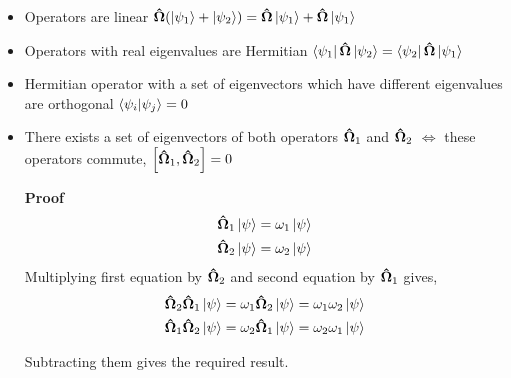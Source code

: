 \documentclass[11pt]{article}
\theoremstyle{definition}
\begin{document}
\begin{itemize}
    \item Operators are linear $\vectorunit{\Omega} (\ket{\psi_1} + \ket{\psi_2}) =\vectorunit{\Omega}  \ket{\psi_1} + \vectorunit{\Omega}\ket{\psi_1} $
    \item Operators with real eigenvalues are Hermitian $\bra{\psi_1}\vectorunit{\Omega}\ket{\psi_2} = \bra{\psi_2}\vectorunit{\Omega}\ket{\psi_1}$
    \item Hermitian operator with a set of eigenvectors which have different eigenvalues are orthogonal $\bra{\psi_i}\ket{\psi_j} = 0$
    \item There exists a set of eigenvectors of both operators $\vectorunit{\Omega}_1$ and $\vectorunit{\Omega}_2$ $\iff$ these operators commute, $\comm{\vectorunit{\Omega}_1}{\vectorunit{\Omega}_2} = 0$
    \begin{shaded}
    \textbf{Proof}
    \begin{gather*}
        \vectorunit{\Omega}_1 \ket{\psi} = \omega_1 \ket{\psi}\\
        \vectorunit{\Omega}_2 \ket{\psi} = \omega_2 \ket{\psi}
    \end{gather*}
    Multiplying first equation by $\vectorunit{\Omega}_2$ and second equation by $\vectorunit{\Omega}_1$ gives,
    \begin{gather*}
        \vectorunit{\Omega}_2 \vectorunit{\Omega}_1 \ket{\psi} = \omega_1 \vectorunit{\Omega}_2 \ket{\psi} = \omega_1 \omega_2 \ket{\psi}\\
        \vectorunit{\Omega}_1 \vectorunit{\Omega}_2 \ket{\psi} = \omega_2 \vectorunit{\Omega}_1 \ket{\psi} = \omega_2 \omega_1 \ket{\psi}\\
    \end{gather*}
    
    Subtracting them gives the required result.
    \end{shaded}
\end{itemize}

    
\end{document}
